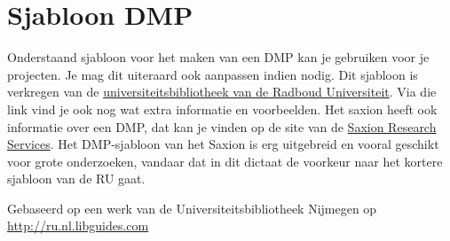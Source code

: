 \chapter{Sjabloon DMP}
\label{ap:dmp}
Onderstaand sjabloon voor het maken van een DMP kan je gebruiken voor je projecten. Je mag dit uiteraard ook aanpassen indien nodig. Dit sjabloon is verkregen van de \href{https://libguides.ru.nl/datamanagement/dm}{\textsf{universiteitsbibliotheek van de Radboud Universiteit}}. Via die link vind je ook nog wat extra informatie en voorbeelden. Het saxion heeft ook informatie over een DMP, dat kan je vinden op de site van de \href{https://srs.saxion.nl/}{\textsf{Saxion Research Services}}. Het DMP-sjabloon van het Saxion is erg uitgebreid en vooral geschikt voor grote onderzoeken, vandaar dat in dit dictaat de voorkeur naar het kortere sjabloon van de RU gaat. 

Gebaseerd op een werk van de Universiteitsbibliotheek Nijmegen op \href{http://ru.nl.libguides.com}{\textsf{http://ru.nl.libguides.com}}

